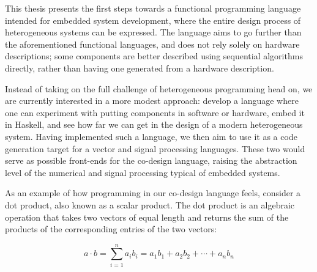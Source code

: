 \documentclass[../main.tex]{subfiles}
\begin{document}
This thesis presents the first steps towards a functional programming language intended for embedded system development, where the entire design process of heterogeneous systems can be expressed. The language aims to go further than the aforementioned functional languages, and does not rely solely on hardware descriptions; some components are better described using sequential algorithms directly, rather than having one generated from a hardware description.

Instead of taking on the full challenge of heterogeneous programming head on, we are currently interested in a more modest approach: develop a language where one can experiment with putting components in software or hardware, embed it in Haskell, and see how far we can get in the design of a modern heterogeneous system. Having implemented such a language, we then aim to use it as a code generation target for a vector and signal processing languages. These two would serve as possible front-ends for the co-design language, raising the abstraction level of the numerical and signal processing typical of embedded systems.


As an example of how programming in our co-design language feels, consider a dot product, also known as a scalar product. The dot product is an algebraic operation that takes two vectors of equal length and returns the sum of the products of the corresponding entries of the two vectors:

\begin{equation}
a \cdot b = \sum_{i=1}^{n}a_{i}b_{i} = a_{1}b_{1} + a_{2}b_{2} + \cdots + a_{n}b_{n}
\end{equation}

\end{document}
